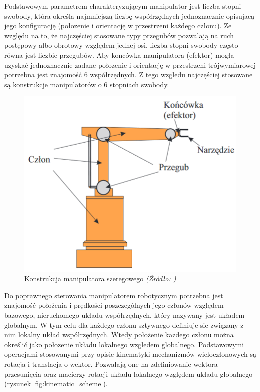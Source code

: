 \documentclass[a4paper, 12pt, twoside]{article}
\begin{document}
Podstawowym parametrem charakteryzującym manipulator jest liczba stopni swobody, która określa najmniejszą liczbę współrzędnych jednoznacznie opisujacą jego konfigurację (połozenie i orientację w przestrzeni każdego członu). Ze względu na to, że najczęściej stosowane typy przegubów pozwalają na ruch postępowy albo obrotowy względem jednej osi, liczba stopni swobody
często równa jest liczbie przegubów. Aby koncówka manipulatora (efektor) mogła uzyskać jednoznacznie zadane połozenie i orientację w przestrzeni trójwymiarowej potrzebna jest znajomość 6 współrzędnych. Z tego wzgledu najczęściej stosowane są konstrukcje manipulatorów o 6 stopniach swobody.

\begin{figure}[H]
\centering
\includegraphics[width=0.6\linewidth]{images/manipulator_scheme.png}
\caption{Konstrukcja manipulatora szeregowego\textit{ (Źródło: \cite{lectures}) } }
\label{fig:manipulator_scheme}
\end{figure}

Do poprawnego sterowania manipulatorem robotycznym potrzebna jest znajomość położenia i prędkości poszczególnych jego członów względem bazowego, nieruchomego układu współrzędnych, który nazywany jest układem globalnym. W tym celu dla każdego członu sztywnego definiuje sie związany z nim lokalny układ współrzędnych. Wtedy położenie kazdego członu można określić jako połozenie układu lokalnego wzgledem globalnego. Podstawowymi operacjami stosowanymi przy opisie kinematyki mechanizmów wieloczłonowych są rotacja i translacja o wektor. Pozwalają one na zdefiniowanie wektora przesunięcia oraz macierzy rotacji układu lokalnego
względem układu globalnego (rysunek \ref{fig:kinematic_scheme}).
\end{document}
